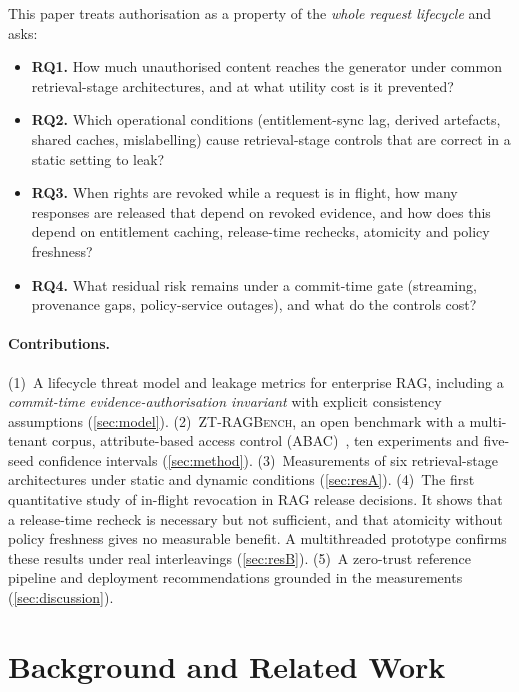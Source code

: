 \documentclass[10pt]{article}
\newcommand{\ztb}{\textsc{ZT-RAGBench}}
\begin{document}
This paper treats authorisation as a property of the \emph{whole request lifecycle} and asks:
\begin{itemize}\itemsep0pt
\item \textbf{RQ1.} How much unauthorised content reaches the generator under common retrieval-stage architectures, and at what utility cost is it prevented?
\item \textbf{RQ2.} Which operational conditions (entitlement-sync lag, derived artefacts, shared caches, mislabelling) cause retrieval-stage controls that are correct in a static setting to leak?
\item \textbf{RQ3.} When rights are revoked while a request is in flight, how many responses are released that depend on revoked evidence, and how does this depend on entitlement caching, release-time rechecks, atomicity and policy freshness?
\item \textbf{RQ4.} What residual risk remains under a commit-time gate (streaming, provenance gaps, policy-service outages), and what do the controls cost?
\end{itemize}

\paragraph{Contributions.}
(1)~A lifecycle threat model and leakage metrics for enterprise RAG, including a \emph{commit-time evidence-authorisation invariant} with explicit consistency assumptions (\cref{sec:model}).
(2)~\ztb{}, an open benchmark with a multi-tenant corpus, attribute-based access control (ABAC)~\cite{nist800162}, ten experiments and five-seed confidence intervals (\cref{sec:method}).
(3)~Measurements of six retrieval-stage architectures under static and dynamic conditions (\cref{sec:resA}).
(4)~The first quantitative study of in-flight revocation in RAG release decisions. It shows that a release-time recheck is necessary but not sufficient, and that atomicity without policy freshness gives no measurable benefit. A multithreaded prototype confirms these results under real interleavings (\cref{sec:resB}).
(5)~A zero-trust reference pipeline and deployment recommendations grounded in the measurements (\cref{sec:discussion}).

\section{Background and Related Work}
\label{sec:related}
\end{document}

